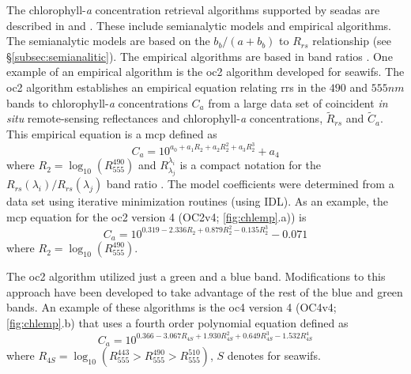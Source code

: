 The chlorophyll-{\it a} concentration retrieval algorithms supported by \gls{seadas} are described in \citet{OReilly1998_Chl} and \citet{OReilly2000}. These include semianalytic models and empirical algorithms. The semianalytic models are based on the $b_b/(a + b_b)$ to $R_{rs}$ relationship \citep{Gordon:1988qv}  (see \S\ref{subsec:semianalitic}). The empirical algorithms are based in band ratios \citep{OReilly2000}. One example of an empirical algorithm is the \gls{oc2} algorithm developed for \gls{seawifs}. The \gls{oc2} algorithm establishes an empirical equation relating \gls{rrs} in the $490$ and $555nm$ bands to chlorophyll-{\it a} concentrations $C_a$ from a large data set of coincident {\it in situ} remote-sensing reflectances and chlorophyll-{\it a} concentrations, $\tilde{R}_{rs}$ and $\tilde{C}_a$. This empirical equation is a \gls{mcp} defined as
\begin{equation}\label{eq:oc2}
  C_a = 10^{\displaystyle a_0+a_1R_2+a_2R_2^2+a_3R_2^3} + a_4
\end{equation}
\noindent where $R_2=\log_{10}\left(R_{555}^{490}\right)$ and $R_{\lambda_j}^{\lambda_i}$ is a compact notation for the $R_{rs}(\lambda_i)/R_{rs}(\lambda_j)$ band ratio \citep{OReilly2000}. The model coefficients were determined from a data set using iterative minimization routines (using IDL). As an example, the \gls{mcp} equation for the \gls{oc2} version 4 (OC2v4; \autoref{fig:chlemp}.a)) is
\begin{equation}
  C_a = 10^{\displaystyle 0.319-2.336R_2+0.879R_2^2-0.135R_2^3} - 0.071
\end{equation}
\noindent where $R_2=\log_{10}\left(R_{555}^{490}\right)$.

The \gls{oc2} algorithm utilized just a green and a blue band. Modifications to this approach have been developed to take advantage of the rest of the blue and green bands. An example of these algorithms is the \gls{oc4} version 4 (OC4v4; \autoref{fig:chlemp}.b) that uses a fourth order polynomial equation defined as
\begin{equation}
  C_a = 10^{\displaystyle 0.366-3.067R_{4S}+1.930R_{4S}^2+0.649R_{4S}^3-1.532R_{4S}^4}
\end{equation}
\noindent where $R_{4S}=\log_{10}\left(R_{555}^{443}>R_{555}^{490}>R_{555}^{510}\right)$, $S$ denotes for \gls{seawifs}.

